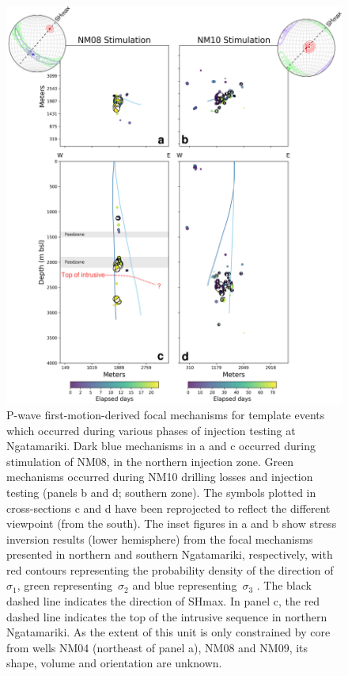 \begin{figure}[h!]
\begin{center}
\includegraphics[width=0.84\columnwidth]{Chapter_3_Nga/figures/Nga_stims_map_depth_beachballs_stress_final_labels_10-5_intrusive_colored/Nga_stims_map_depth_beachballs_stress_GC_labels_12-5_intrusive_colored_dpi300_original}
\caption{{P-wave first-motion-derived focal mechanisms for template events which
occurred during various phases of injection testing at Ngatamariki. Dark
blue mechanisms in a and c occurred during stimulation of NM08, in the
northern injection zone. Green mechanisms occurred during NM10 drilling
losses and injection testing (panels b and d; southern zone). The
symbols plotted in cross-sections c and d have been reprojected to
reflect the different viewpoint (from the south). The inset figures in a
and b show stress inversion results (lower hemisphere) from the focal
mechanisms presented in northern and southern Ngatamariki, respectively,
with red contours representing the probability density of the direction
of~\(\sigma_1\), green representing~\(\sigma_2\) and blue
representing~\(\sigma_3\) . The black dashed line indicates the
direction of SHmax. In panel c, the red dashed line indicates the top of
the intrusive sequence in northern Ngatamariki. As the extent of this
unit is only constrained by core from wells NM04 (northeast of panel a),
NM08 and NM09, its shape, volume and orientation are unknown.
{\label{532034}}%
}}
\end{center}
\end{figure}

